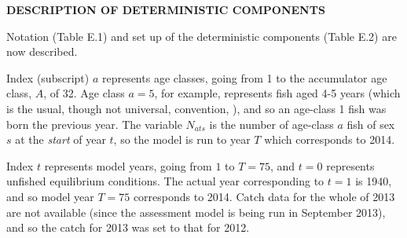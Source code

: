 \documentclass[11pt]{article}   %
\def\AppLet{E}                   %
\def\finalYr{2014}               %
\def\headc{\vspace{-1ex}} %
\def\subsub#1{\noindent {\bf #1} \headc}    %
\newcommand{\popQCS}{Edwards-etal:2012pop}
\newcommand{\ymr}{Edwards-etal:2012ymr}
\begin{document}
\medskip

{\bf DESCRIPTION OF DETERMINISTIC COMPONENTS}

Notation (Table \AppLet.1) and set up of the deterministic components (Table \AppLet.2) are now described.


\subsub{Age classes}

Index (subscript) $a$ represents age classes, going from 1 to the accumulator age class, $A$, of 32. Age class $a=5$, for example, represents fish aged 4-5 years (which is the usual, though not universal, convention, \citealt{casw01}), and so an age-class 1 fish was born the previous year. The variable $N_{ats}$ is the number of age-class $a$ fish of sex $s$ at the {\it start} of year $t$, so the model is run to year $T$ which corresponds to \finalYr.


% 
\subsub{Years}

Index $t$ represents model years, going from $1$ to $T=75$, and $t=0$ represents unfished equilibrium conditions. The actual year corresponding to $t=1$ is 1940, and so model year $T=75$ corresponds to \finalYr. 
Catch data for the whole of 2013 are not available (since the assessment model is being run in September 2013), and so the catch for 2013 was set to that for 2012. 
\end{document}

